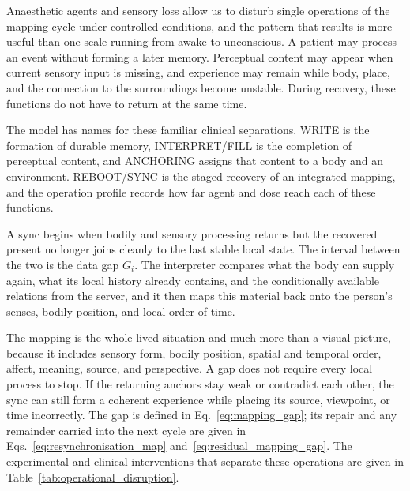Anaesthetic agents and sensory loss allow us to disturb single operations of the
mapping cycle under controlled conditions, and the pattern that results is more
useful than one scale running from awake to unconscious. A patient may process an
event without forming a later memory. Perceptual content may appear when current
sensory input is missing, and experience may remain while body, place, and the
connection to the surroundings become unstable. During recovery, these functions do
not have to return at the same time.

The model has names for these familiar clinical separations. WRITE is the formation
of durable memory, INTERPRET/FILL is the completion of perceptual content, and
ANCHORING assigns that content to a body and an environment. REBOOT/SYNC is the
staged recovery of an integrated mapping, and the operation profile records how far
agent and dose reach each of these functions.

A sync begins when bodily and sensory processing returns but the recovered present
no longer joins cleanly to the last stable local state. The interval between the two
is the data gap $G_i$. The interpreter compares what the body can supply again, what
its local history already contains, and the conditionally available relations from
the server, and it then maps this material back onto the person's senses, bodily
position, and local order of time.

The mapping is the whole lived situation and much more than a visual
picture, because it includes sensory form, bodily position, spatial and temporal
order, affect, meaning, source, and perspective. A gap does not require every local
process to stop. If the returning anchors stay weak or contradict each other, the
sync can still form a coherent experience while placing its source, viewpoint, or
time incorrectly. The gap is defined in Eq.~\eqref{eq:mapping_gap}; its repair and
any remainder carried into the next cycle are given in
Eqs.~\eqref{eq:resynchronisation_map} and~\eqref{eq:residual_mapping_gap}. The
experimental and clinical interventions that separate these operations are given in
Table~\ref{tab:operational_disruption}.

